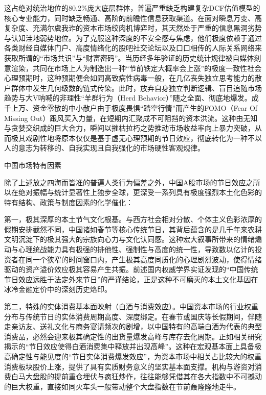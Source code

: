 \documentclass{cupb-thesis}
\begin{document}
这占绝对统治地位的80.2\%庞大底层群体，普遍严重缺乏构建复杂DCF估值模型的核心专业能力，同时缺乏畅通、高阶的前瞻性信息获取渠道。在面对瞬息万变、高复杂度、充满尔虞我诈的资本市场绞肉机博弈时，其天然处于严重的信息黑洞劣势与认知洼地弱势地位。为了克服这种深度的不安全感与焦虑，他们极度依赖于通过各类财经自媒体门户、高度情绪化的股吧社交论坛以及口口相传的人际关系网络来获取所谓的“市场共识”与“财富密码”。当历经多年验证的历史统计规律被自媒体刻意渲染，共同在市场上人为制造出一种“节前铁定大概率会上涨”的极度一致性社会心理预期时，这种预期便会如同高致病性病毒一般，在几亿丧失独立思考能力的散户群体中发生几何级数的链式传染。此时，放弃自身独立判断逻辑、盲目追随市场趋势与大V呐喊的非理性“羊群行为（Herd Behavior）”随之全面、彻底地爆发。成千上万、资金零散的中小散户由于极度畏惧“踏空行情”而产生的FOMO（Fear Of Missing Out）跟风买入力量，在短期内汇聚成不可阻挡的资本洪流。这种由无知与贪婪交织成的巨大合力，瞬间以摧枯拉朽之势推动市场收益率向上暴力突破，从而极其戏剧性地将原本仅仅是基于虚无心理预期的节日效应，彻底转化为一种不以人的意志为转移的、自我实现且自我强化的市场硬性客观规律。


中国市场特有因素

除了上述放之四海而皆准的普遍人类行为偏差之外，中国A股市场的节日效应之所以在绝对振幅与统计显著性上独步全球，更深受一系列具有极度强烈本土化色彩的特有结构、政策与制度因素的化学催化：


第一，极其深厚的本土节气文化根基。与西方社会相对分散、个体主义色彩浓厚的假期安排截然不同，中国诸如春节等核心传统节日，其背后蕴含的是几千年来农耕文明沉淀下的极其强大的宗族向心力与文化认同感。这种宏大叙事所带来的情绪煽动与心理统战能力具有极强的排他性、强制性与高度的统一性，导致数以亿计的投资者在同一个狭窄的时间窗口内，产生极其高度同质化的心理剧烈波动，使得情绪驱动的资产溢价效应极其容易产生共振。前述国内权威学界实证发现的“中国传统节日效应远胜于法定外来节日”的严谨结论，正是这种不可磨灭的本土文化基因在冰冷金融定价中的深刻历史烙印。


第二，特殊的实体消费基本面映射（白酒与消费效应）。中国资本市场的行业权重分布与传统节日的实体消费周期高度、深度绑定。在春节或国庆等长假期间，伴随走亲访友、送礼文化与商务宴请频次的剧增，以中国特有的高端白酒为代表的典型消费品，必然会迎来极其确定性的出货量爆发高峰与库存去化周期。正如相关研究揭示的“节日效应使得白酒消费集中释放并出现高峰”。这种在宏观基本面上具备极高确定性与能见度的“节日实体消费爆发效应”，为资本市场中相关占比较大的权重消费板块股价上涨，提供了具有实质财务意义的坚实基本面支撑。机构与游资对消费白马大盘股的提前重仓埋伏与疯狂炒作，往往能够凭借其在各大指数中不可撼动的巨大权重，直接如同火车头一般带动整个大盘指数在节前轰隆隆地走牛。
\end{document}
